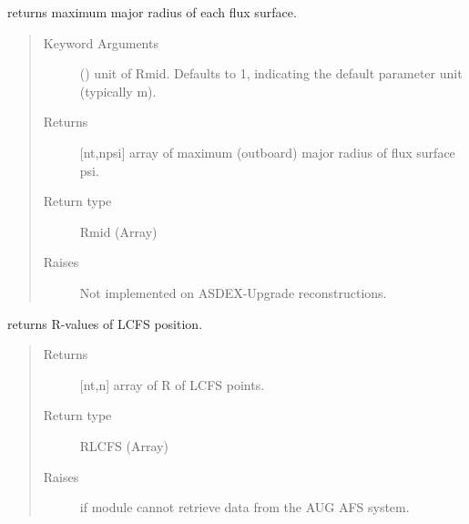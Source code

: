 \documentclass[letterpaper,10pt,english]{sphinxmanual}
\begin{document}
\begin{fulllineitems}
\begin{fulllineitems}
\label{\detokenize{eqtools:eqtools.AUGData.AUGDDData.getRmidPsi}}
returns maximum major radius of each flux surface.
\begin{quote}\begin{description}
\item[{Keyword Arguments}] \leavevmode
{} () \textendash{} unit of Rmid.  Defaults to 1, indicating
the default parameter unit (typically m).

\item[{Returns}] \leavevmode
{[}nt,npsi{]} array of maximum (outboard) major radius of
flux surface psi.

\item[{Return type}] \leavevmode
Rmid (Array)

\item[{Raises}] \leavevmode
{} \textendash{} Not implemented on ASDEX-Upgrade reconstructions.

\end{description}\end{quote}

\end{fulllineitems}


\begin{fulllineitems}
\label{\detokenize{eqtools:eqtools.AUGData.AUGDDData.getRLCFS}}
returns R-values of LCFS position.
\begin{quote}\begin{description}
\item[{Returns}] \leavevmode
{[}nt,n{]} array of R of LCFS points.

\item[{Return type}] \leavevmode
RLCFS (Array)

\item[{Raises}] \leavevmode
{} \textendash{} if module cannot retrieve data from the AUG AFS system.


\end{description}
\end{quote}
\end{fulllineitems}
\end{fulllineitems}
\end{document}
